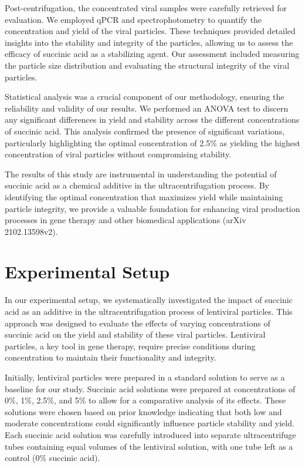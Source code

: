 \documentclass{article}
\begin{document}
Post-centrifugation, the concentrated viral samples were carefully retrieved for evaluation. We employed qPCR and spectrophotometry to quantify the concentration and yield of the viral particles. These techniques provided detailed insights into the stability and integrity of the particles, allowing us to assess the efficacy of succinic acid as a stabilizing agent. Our assessment included measuring the particle size distribution and evaluating the structural integrity of the viral particles.

Statistical analysis was a crucial component of our methodology, ensuring the reliability and validity of our results. We performed an ANOVA test to discern any significant differences in yield and stability across the different concentrations of succinic acid. This analysis confirmed the presence of significant variations, particularly highlighting the optimal concentration of 2.5\% as yielding the highest concentration of viral particles without compromising stability.

The results of this study are instrumental in understanding the potential of succinic acid as a chemical additive in the ultracentrifugation process. By identifying the optimal concentration that maximizes yield while maintaining particle integrity, we provide a valuable foundation for enhancing viral production processes in gene therapy and other biomedical applications (arXiv 2102.13598v2).

\section{Experimental Setup}
In our experimental setup, we systematically investigated the impact of succinic acid as an additive in the ultracentrifugation process of lentiviral particles. This approach was designed to evaluate the effects of varying concentrations of succinic acid on the yield and stability of these viral particles. Lentiviral particles, a key tool in gene therapy, require precise conditions during concentration to maintain their functionality and integrity.

Initially, lentiviral particles were prepared in a standard solution to serve as a baseline for our study. Succinic acid solutions were prepared at concentrations of 0\%, 1\%, 2.5\%, and 5\% to allow for a comparative analysis of its effects. These solutions were chosen based on prior knowledge indicating that both low and moderate concentrations could significantly influence particle stability and yield. Each succinic acid solution was carefully introduced into separate ultracentrifuge tubes containing equal volumes of the lentiviral solution, with one tube left as a control (0\% succinic acid).
\end{document}

